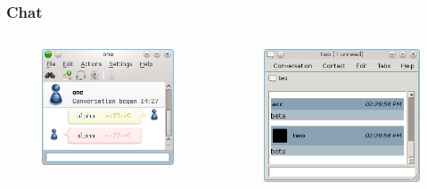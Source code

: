 \documentclass{beamer}
\begin{document}
\begin{frame}[fragile]
    \frametitle{Chat}
    \begin{columns}
    
    \begin{column}{0.46\textwidth}
    \begin{figure}[htb]
    \includegraphics[width=\textwidth]{ktp_msg.png}
    \end{figure}
    \end{column}

    \begin{column}{0.54\textwidth}
    \begin{figure}[htb]
    \includegraphics[width=\textwidth]{empathy_msg.png}
    \end{figure}
    \end{column}

    \end{columns}
\end{frame}
\end{document}
